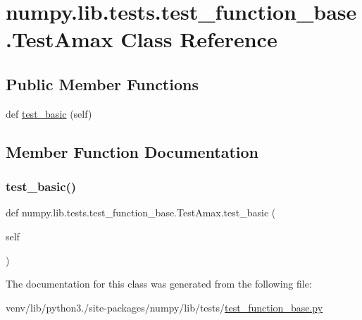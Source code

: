 \hypertarget{classnumpy_1_1lib_1_1tests_1_1test__function__base_1_1TestAmax}{}\section{numpy.\+lib.\+tests.\+test\+\_\+function\+\_\+base.\+Test\+Amax Class Reference}
\label{classnumpy_1_1lib_1_1tests_1_1test__function__base_1_1TestAmax}
\subsection*{Public Member Functions}
\begin{DoxyCompactItemize}
\item 
def \hyperlink{classnumpy_1_1lib_1_1tests_1_1test__function__base_1_1TestAmax_a4ea37e965fb0f85dfd6cd05c8f8d3d01}{test\+\_\+basic} (self)
\end{DoxyCompactItemize}


\subsection{Member Function Documentation}
\mbox{\label{classnumpy_1_1lib_1_1tests_1_1test__function__base_1_1TestAmax_a4ea37e965fb0f85dfd6cd05c8f8d3d01}} 
\subsubsection{\texorpdfstring{test\+\_\+basic()}{test\_basic()}}
{\footnotesize\ttfamily def numpy.\+lib.\+tests.\+test\+\_\+function\+\_\+base.\+Test\+Amax.\+test\+\_\+basic (\begin{DoxyParamCaption}\item[{}]{self }\end{DoxyParamCaption})}



The documentation for this class was generated from the following file\+:\begin{DoxyCompactItemize}
\item 
venv/lib/python3./site-\/packages/numpy/lib/tests/\hyperlink{lib_2tests_2test__function__base_8py}{test\+\_\+function\+\_\+base.\+py}\end{DoxyCompactItemize}
